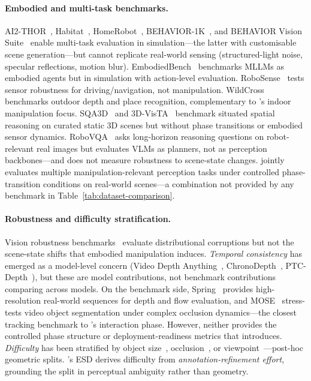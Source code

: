 \paragraph{Embodied and multi-task benchmarks.}
AI2-THOR~\citep{kolve2017ai2thor}, Habitat~\citep{savva2019habitat}, HomeRobot~\citep{yenamandra2023homerobot}, BEHAVIOR-1K~\citep{li2023behavior1k}, and BEHAVIOR Vision Suite~\citep{ge2024behavior} enable multi-task evaluation in simulation---the latter with customisable scene generation---but cannot replicate real-world sensing (structured-light noise, specular reflections, motion blur).
EmbodiedBench~\citep{yang2025embodiedbench} benchmarks MLLMs as embodied agents but in simulation with action-level evaluation.
RoboSense~\citep{kong2025robosense} tests sensor robustness for driving/navigation, not manipulation.
WildCross~\citep{knights2026wildcross} benchmarks outdoor depth and place recognition, complementary to \coolname{}'s indoor manipulation focus.
SQA3D~\citep{ma2022sqa3d} and 3D-VisTA~\citep{zhu20233dvista} benchmark situated spatial reasoning on curated static 3D scenes but without phase transitions or embodied sensor dynamics.
RoboVQA~\citep{sermanet2023robovqa} asks long-horizon reasoning questions on robot-relevant real images but evaluates VLMs as planners, not as perception backbones---and does not measure robustness to scene-state changes.
\coolname{} jointly evaluates multiple manipulation-relevant perception tasks under controlled phase-transition conditions on real-world scenes---a combination not provided by any benchmark in Table~\ref{tab:dataset-comparison}.

\paragraph{Robustness and difficulty stratification.}
Vision robustness benchmarks~\citep{hendrycks2019benchmarking, taori2020measuring} evaluate distributional corruptions but not the scene-state shifts that embodied manipulation induces.
\textit{Temporal consistency} has emerged as a model-level concern (Video Depth Anything~\citep{yang2025videodepthanything}, ChronoDepth~\citep{shao2025chronodepth}, PTC-Depth~\citep{li2026ptcdepth}), but these are model contributions, not benchmark contributions comparing across models.
On the benchmark side, Spring~\citep{mehl2023spring} provides high-resolution real-world sequences for depth and flow evaluation, and MOSE~\citep{ding2023mose} stress-tests video object segmentation under complex occlusion dynamics---the closest tracking benchmark to \coolname{}'s interaction phase.
However, neither provides the controlled phase structure or deployment-readiness metrics that \coolname{} introduces.
\textit{Difficulty} has been stratified by object size~\citep{lin2014coco}, occlusion~\citep{hodan2024bop}, or viewpoint~\citep{xiang2018posecnn}---post-hoc geometric splits.
\coolname{}'s ESD derives difficulty from \textit{annotation-refinement effort}, grounding the split in perceptual ambiguity rather than geometry.

